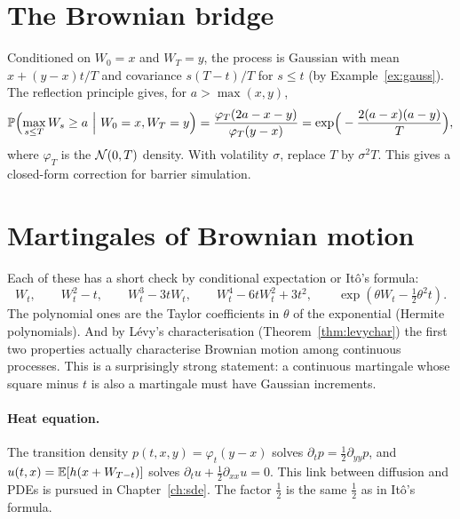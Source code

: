 \section{The Brownian bridge}\label{sec:bridge}

Conditioned on $W_0=x$ and $W_T=y$, the process is Gaussian with mean $x+(y-x)t/T$ and covariance $s(T-t)/T$ for $s\le t$ (by Example~\ref{ex:gauss}). The reflection principle gives, for $a>\max(x,y)$,
\begin{equation}\label{eq:bridge}
\Prob\Bigl(\max_{s\le T}W_s\ge a\ \Big|\ W_0=x,W_T=y\Bigr)=\frac{\varphi_T(2a-x-y)}{\varphi_T(y-x)}=\exp\!\Big(-\frac{2(a-x)(a-y)}{T}\Big),
\end{equation}
where $\varphi_T$ is the $\mathcal{N}(0,T)$ density. With volatility $\sigma$, replace $T$ by $\sigma^2T$. This gives a closed-form correction for barrier simulation.

\section{Martingales of Brownian motion}

Each of these has a short check by conditional expectation or It\^o's formula:
\[
W_t,\qquad W_t^2-t,\qquad W_t^3-3tW_t,\qquad W_t^4-6tW_t^2+3t^2,\qquad \exp(\theta W_t-\tfrac12\theta^2t).
\]
The polynomial ones are the Taylor coefficients in $\theta$ of the exponential (Hermite polynomials). And by L\'evy's characterisation (Theorem~\ref{thm:levychar}) the first two properties actually characterise Brownian motion among continuous processes. This is a surprisingly strong statement: a continuous martingale whose square minus $t$ is also a martingale must have Gaussian increments.

\paragraph{Heat equation.} The transition density $p(t,x,y)=\varphi_t(y-x)$ solves $\partial_tp=\tfrac12\partial_{yy}p$, and $u(t,x)=\mathbb{E}[h(x+W_{T-t})]$ solves $\partial_tu+\tfrac12\partial_{xx}u=0$. This link between diffusion and PDEs is pursued in Chapter~\ref{ch:sde}. The factor $\tfrac12$ is the same $\tfrac12$ as in It\^o's formula.

